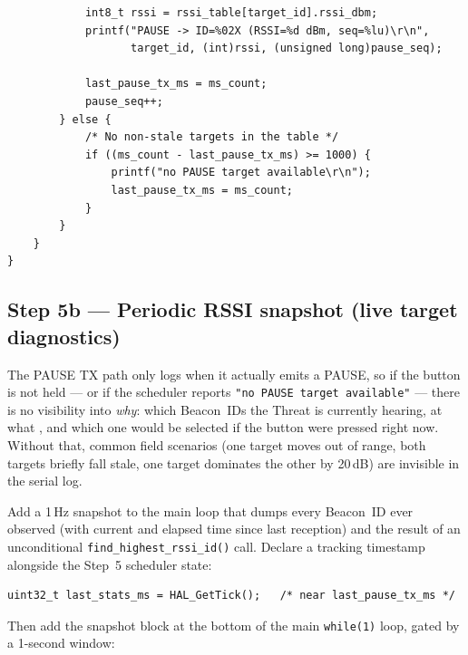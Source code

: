 \documentclass[11pt,letterpaper]{article}
\begin{document}
\begin{enumerate}[leftmargin=2em]
\begin{verbatim}
            int8_t rssi = rssi_table[target_id].rssi_dbm;
            printf("PAUSE -> ID=%02X (RSSI=%d dBm, seq=%lu)\r\n",
                   target_id, (int)rssi, (unsigned long)pause_seq);

            last_pause_tx_ms = ms_count;
            pause_seq++;
        } else {
            /* No non-stale targets in the table */
            if ((ms_count - last_pause_tx_ms) >= 1000) {
                printf("no PAUSE target available\r\n");
                last_pause_tx_ms = ms_count;
            }
        }
    }
}
\end{verbatim}
\end{enumerate}

\subsection{Step 5b --- Periodic RSSI snapshot (live target diagnostics)}

The PAUSE TX path only logs when it actually emits a PAUSE, so if the button is not held --- or if the scheduler reports \texttt{"no PAUSE target available"} --- there is no visibility into \emph{why}: which Beacon~IDs the Threat is currently hearing, at what \RSSI{}, and which one would be selected if the button were pressed right now. Without that, common field scenarios (one target moves out of range, both targets briefly fall stale, one target dominates the other by 20\,dB) are invisible in the serial log.

Add a 1\,Hz snapshot to the main loop that dumps every Beacon~ID ever observed (with current \RSSI{} and elapsed time since last reception) and the result of an unconditional \texttt{find\_highest\_rssi\_id()} call. Declare a tracking timestamp alongside the Step~5 scheduler state:
\begin{verbatim}
uint32_t last_stats_ms = HAL_GetTick();   /* near last_pause_tx_ms */
\end{verbatim}
Then add the snapshot block at the bottom of the main \texttt{while(1)} loop, gated by a 1-second window:
\end{document}
